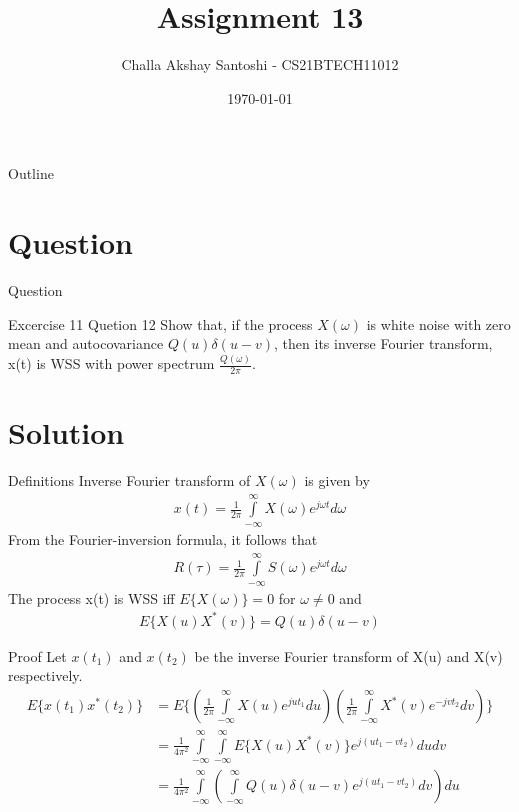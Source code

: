 \documentclass{beamer}
\title{Assignment 13}
\author{Challa Akshay Santoshi - CS21BTECH11012}
\date{\today}
\begin{document}
\begin{frame}
    \titlepage 
\end{frame}

\logo{}


\begin{frame}{Outline}
    \tableofcontents
\end{frame}


\section{Question}
\begin{frame}{Question}
\begin{block}{Excercise 11 Quetion 12} Show that, if the process $X(\omega)$ is white noise with zero mean and autocovariance $Q(u)\delta(u-v)$, then its inverse Fourier transform, x(t) is WSS with power spectrum $\frac{Q(\omega)}{2\pi}$.
    \end{block}
\end{frame}

\section{Solution}
\begin{frame}{Definitions}
Inverse Fourier transform of $X(\omega)$ is given by
\begin{align}
    x(t) = \frac{1}{2\pi} \int\limits_{-\infty}^\infty X(\omega) e^{j\omega t} d\omega
\end{align}
From the Fourier-inversion formula, it follows that
\begin{align}
    R(\tau) = \frac{1}{2\pi} \int\limits_{-\infty}^\infty S(\omega) e^{j\omega t} d\omega
\end{align}
The process x(t) is WSS iff $E\{X(\omega)\} = 0$ for $\omega \neq 0$ and 
\begin{align}
    E\{X(u)X^*(v)\} = Q(u)\delta(u-v)
\end{align}
\end{frame}

\begin{frame}{Proof}
Let $x(t_1)$ and $x(t_2)$ be the inverse Fourier transform of X(u) and X(v) respectively.
\begin{align}
    E\{x(t_1)x^*(t_2)\} &= E\{(\frac{1}{2\pi} \int\limits_{-\infty}^\infty X(u)e^{jut_1} du ) (\frac{1}{2\pi} \int\limits_{-\infty}^\infty X^*(v)e^{-jvt_2} dv )\}\\
    &= \frac{1}{4\pi^2} \int\limits_{-\infty}^\infty \int\limits_{-\infty}^\infty E\{X(u)X^*(v)\} e^{j(ut_1 - vt_2)} du dv\\
    &= \frac{1}{4\pi^2} \int\limits_{-\infty}^\infty (\int\limits_{-\infty}^\infty Q(u)\delta(u-v) e^{j(ut_1 - vt_2)} dv) du
\end{align}
\end{frame}
\end{document}
